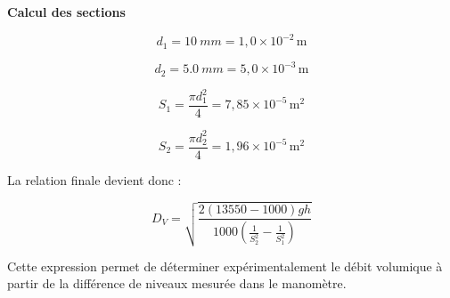 \documentclass[a4paper,11pt,fleqn]{scrartcl}%
\begin{document}
\begin{enumerate}
\bigskip

\textbf{Calcul des sections}

\[
d_1=\SI{10}{mm}=1,0\times10^{-2}\,\text{m}
\]

\[
d_2=\SI{5,0}{mm}=5,0\times10^{-3}\,\text{m}
\]

\[
S_1=\frac{\pi d_1^2}{4}
=7,85\times10^{-5}\,\text{m}^2
\]

\[
S_2=\frac{\pi d_2^2}{4}
=1,96\times10^{-5}\,\text{m}^2
\]

La relation finale devient donc :

\[
D_V =
\sqrt{
\frac{2(13550-1000)gh}
{1000
\left(\frac{1}{S_2^2}-\frac{1}{S_1^2}\right)}
}
\]

Cette expression permet de déterminer expérimentalement le débit volumique à partir de la différence de niveaux mesurée dans le manomètre.

\end{enumerate}
\end{document}

